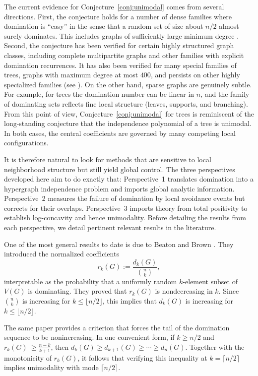 \documentclass[11pt]{amsart}
\numberwithin{equation}{section}
\newcommand{\VV}{V(G)}
\begin{document}
The current evidence for Conjecture~\ref{conj:unimodal} comes from several directions. First, the conjecture holds for a number of dense families where domination is ``easy'' in the sense that a random set of size about $n/2$ almost surely dominates. This includes graphs of sufficiently large minimum degree \cite{BeatonBrown2022}. Second, the conjecture has been verified for certain highly structured graph classes, including complete multipartite graphs \cite{BeatonBrown2022} and other families with explicit domination recurrences. It has also been verified for many special families of trees, graphs with maximum degree at most $400$, and persists on other highly specialized families (see \cite{Burcroff2023}). On the other hand, sparse graphs are genuinely subtle. For example, for trees the domination number can be linear in $n$, and the family of dominating sets reflects fine local structure (leaves, supports, and branching). From this point of view, Conjecture~\ref{conj:unimodal} for trees is reminiscent of the long-standing conjecture that the independence polynomial of a tree is unimodal. In both cases, the central coefficients are governed by many competing local configurations.

It is therefore natural to look for methods that are sensitive to local neighborhood structure but still yield global control. The three perspectives developed here aim to do exactly that: Perspective~1 translates domination into a hypergraph independence problem and imports global analytic information. Perspective~2 measures the failure of domination by local avoidance events but corrects for their overlaps. Perspective~3 imports theory from total positivity to establish log-concavity and hence unimodality. Before detailing the results from each perspective, we detail pertinent relevant results in the literature.

One of the most general results to date is due to Beaton and Brown \cite{BeatonBrown2022}. They introduced the normalized coefficients
\begin{equation}\label{eq:rkDef}
r_k(G):=\frac{d_k(G)}{\binom{n}{k}},
\end{equation}
interpretable as the probability that a uniformly random $k$-element subset of $\VV$ is dominating. They proved that $r_k(G)$ is nondecreasing in $k$. Since $\binom{n}{k}$ is increasing for $k\le \lfloor n/2\rfloor$, this implies that $d_k(G)$ is increasing for $k\le \lfloor n/2\rfloor$.

The same paper provides a criterion that forces the tail of the domination sequence to be nonincreasing. In one convenient form, if $k\ge n/2$ and $r_k(G)\ \ge \frac{n-k}{k+1}$, then $d_{k}(G)\ge d_{k+1}(G)\ge \cdots \ge d_n(G)$. Together with the monotonicity of $r_k(G)$, it follows that verifying this inequality at $k=\lceil n/2\rceil$ implies unimodality with mode $\lceil n/2\rceil$. 
\end{document}
